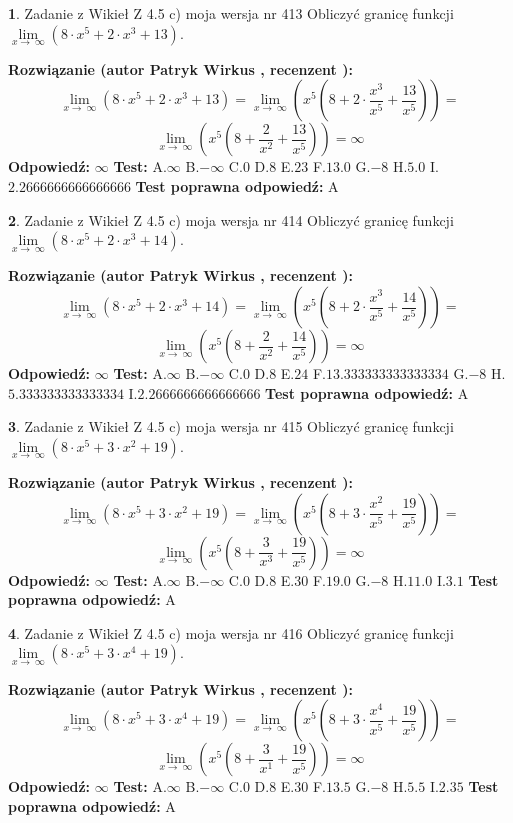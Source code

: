 \documentclass[12pt, a4paper]{article}
\theoremstyle{definition} %
\newtheorem{zad}{}
\newcommand{\zadStart}[1]{\begin{zad}#1\newline}
\newcommand{\zadStop}{\end{zad}}
\newcommand{\rozwStart}[2]{\noindent \textbf{Rozwiązanie (autor #1 , recenzent #2): }\newline}
\newcommand{\rozwStop}{\newline}
\newcommand{\odpStart}{\noindent \textbf{Odpowiedź:}\newline}
\newcommand{\odpStop}{\newline}
\newcommand{\testStart}{\noindent \textbf{Test:}\newline}
\newcommand{\testStop}{\newline}
\newcommand{\kluczStart}{\noindent \textbf{Test poprawna odpowiedź:}\newline}
\newcommand{\kluczStop}{\newline}
\begin{document}
\zadStart{Zadanie z Wikieł Z 4.5 c) moja wersja nr 413}
Obliczyć granicę funkcji  $\lim\limits_{x\to\ \infty}(8 \cdot x^{5}+2 \cdot x^{3}+13)$.
\zadStop
\rozwStart{Patryk Wirkus}{}
$$\lim\limits_{x\to\ \infty}(8 \cdot x^{5}+2 \cdot x^{3}+13) = \lim\limits_{x\to\ \infty}(x^{5}(8 +2 \cdot \frac{x^{3}}{x^{5}}+\frac{13}{x^{5}})) =$$ $$\lim\limits_{x\to\ \infty}(x^{5}(8 +\frac{2}{x^{2}}+\frac{13}{x^{5}})) =\infty$$
\rozwStop
\odpStart
$\infty$
\odpStop
\testStart
A.$\infty$ B.$-\infty$ C.$0$ D.$8$ E.$23$
F.$13.0$ G.$-8$
H.$5.0$
I.$2.2666666666666666$
\testStop
\kluczStart
A
\kluczStop



\zadStart{Zadanie z Wikieł Z 4.5 c) moja wersja nr 414}
Obliczyć granicę funkcji  $\lim\limits_{x\to\ \infty}(8 \cdot x^{5}+2 \cdot x^{3}+14)$.
\zadStop
\rozwStart{Patryk Wirkus}{}
$$\lim\limits_{x\to\ \infty}(8 \cdot x^{5}+2 \cdot x^{3}+14) = \lim\limits_{x\to\ \infty}(x^{5}(8 +2 \cdot \frac{x^{3}}{x^{5}}+\frac{14}{x^{5}})) =$$ $$\lim\limits_{x\to\ \infty}(x^{5}(8 +\frac{2}{x^{2}}+\frac{14}{x^{5}})) =\infty$$
\rozwStop
\odpStart
$\infty$
\odpStop
\testStart
A.$\infty$ B.$-\infty$ C.$0$ D.$8$ E.$24$
F.$13.333333333333334$ G.$-8$
H.$5.333333333333334$
I.$2.2666666666666666$
\testStop
\kluczStart
A
\kluczStop



\zadStart{Zadanie z Wikieł Z 4.5 c) moja wersja nr 415}
Obliczyć granicę funkcji  $\lim\limits_{x\to\ \infty}(8 \cdot x^{5}+3 \cdot x^{2}+19)$.
\zadStop
\rozwStart{Patryk Wirkus}{}
$$\lim\limits_{x\to\ \infty}(8 \cdot x^{5}+3 \cdot x^{2}+19) = \lim\limits_{x\to\ \infty}(x^{5}(8 +3 \cdot \frac{x^{2}}{x^{5}}+\frac{19}{x^{5}})) =$$ $$\lim\limits_{x\to\ \infty}(x^{5}(8 +\frac{3}{x^{3}}+\frac{19}{x^{5}})) =\infty$$
\rozwStop
\odpStart
$\infty$
\odpStop
\testStart
A.$\infty$ B.$-\infty$ C.$0$ D.$8$ E.$30$
F.$19.0$ G.$-8$
H.$11.0$
I.$3.1$
\testStop
\kluczStart
A
\kluczStop



\zadStart{Zadanie z Wikieł Z 4.5 c) moja wersja nr 416}
Obliczyć granicę funkcji  $\lim\limits_{x\to\ \infty}(8 \cdot x^{5}+3 \cdot x^{4}+19)$.
\zadStop
\rozwStart{Patryk Wirkus}{}
$$\lim\limits_{x\to\ \infty}(8 \cdot x^{5}+3 \cdot x^{4}+19) = \lim\limits_{x\to\ \infty}(x^{5}(8 +3 \cdot \frac{x^{4}}{x^{5}}+\frac{19}{x^{5}})) =$$ $$\lim\limits_{x\to\ \infty}(x^{5}(8 +\frac{3}{x^{1}}+\frac{19}{x^{5}})) =\infty$$
\rozwStop
\odpStart
$\infty$
\odpStop
\testStart
A.$\infty$ B.$-\infty$ C.$0$ D.$8$ E.$30$
F.$13.5$ G.$-8$
H.$5.5$
I.$2.35$
\testStop
\kluczStart
A
\kluczStop
\end{document}
